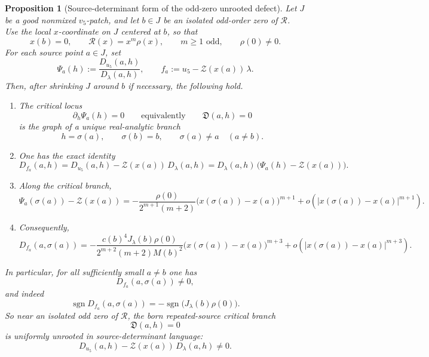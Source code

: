 \documentclass[11pt,a4paper]{amsart}
\theoremstyle{plain}
\newtheorem{proposition}[theorem]{Proposition}
\theoremstyle{definition}
\begin{document}
\begin{proposition}[Source-determinant form of the odd-zero unrooted defect]
\label{prop:source-determinant-form-odd-zero-unrooted-defect}
Let $J$ be a good nonmixed $v_5$-patch, and let $b\in J$ be an isolated
odd-order zero of $\mathcal R$.  Use the local $x$-coordinate on $J$ centered
at $b$, so that
\[
x(b)=0,
\qquad
\mathcal R(x)=x^m\rho(x),
\qquad
m\ge 1 \text{ odd},
\qquad
\rho(0)\neq 0.
\]
For each source point $a\in J$, set
\[
\Psi_a(h):=\frac{D_{u_5}(a,h)}{D_\lambda(a,h)},
\qquad
f_a:=u_5-\mathcal Z(x(a))\,\lambda.
\]
Then, after shrinking $J$ around $b$ if necessary, the following hold.

\begin{enumerate}
\item The critical locus
\[
\partial_h\Psi_a(h)=0
\qquad\text{equivalently}\qquad
\mathfrak D(a,h)=0
\]
is the graph of a unique real-analytic branch
\[
h=\sigma(a),
\qquad
\sigma(b)=b,
\qquad
\sigma(a)\neq a
\quad (a\neq b).
\]

\item One has the exact identity
\[
D_{f_a}(a,h)
=
D_{u_5}(a,h)-\mathcal Z(x(a))\,D_\lambda(a,h)
=
D_\lambda(a,h)\,\bigl(\Psi_a(h)-\mathcal Z(x(a))\bigr).
\]

\item Along the critical branch,
\[
\Psi_a(\sigma(a))-\mathcal Z(x(a))
=
-\frac{\rho(0)}{2^{m+1}(m+2)}
\bigl(x(\sigma(a))-x(a)\bigr)^{m+1}
+o\!\left(\bigl|x(\sigma(a))-x(a)\bigr|^{m+1}\right).
\]

\item Consequently,
\[
D_{f_a}(a,\sigma(a))
=
-\frac{c(b)^4J_\lambda(b)\rho(0)}{2^{m+2}(m+2)M(b)^2}
\bigl(x(\sigma(a))-x(a)\bigr)^{m+3}
+o\!\left(\bigl|x(\sigma(a))-x(a)\bigr|^{m+3}\right).
\]
\end{enumerate}

In particular, for all sufficiently small $a\neq b$ one has
\[
D_{f_a}(a,\sigma(a))\neq 0,
\]
and indeed
\[
\operatorname{sgn}D_{f_a}(a,\sigma(a))
=
-\operatorname{sgn}\!\bigl(J_\lambda(b)\rho(0)\bigr).
\]
So near an isolated odd zero of $\mathcal R$, the born repeated-source
critical branch
\[
\mathfrak D(a,h)=0
\]
is uniformly unrooted in source-determinant language:
\[
D_{u_5}(a,h)-\mathcal Z(x(a))\,D_\lambda(a,h)\neq 0.
\]
\end{proposition}
\end{document}
